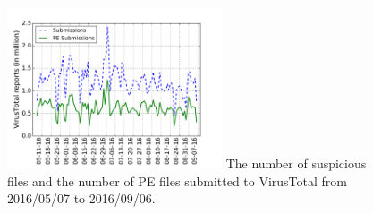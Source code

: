 

\begin{figure}[t!]
\begin{center}
\includegraphics[width=2.5in]{figure/Submissions}
{
The number of suspicious files and the number of PE files submitted to VirusTotal from 2016/05/07 to 2016/09/06. 
}
\end{center}
\end{figure}
